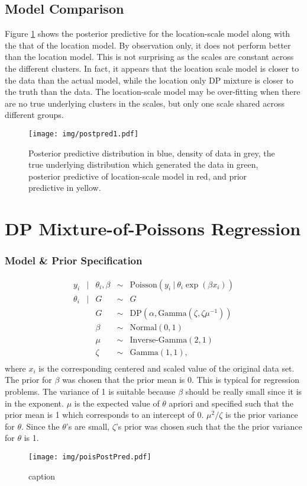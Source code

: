 \documentclass{article}
\def\beginmyfig{\begin{figure}[h]\center}
\def\endmyfig{\end{figure}}
\begin{document}
\subsection{Model Comparison}
Figure \ref{fig:postpred1} shows the posterior predictive for the
location-scale model along with the that of the location model. By observation
only, it does not perform better than the location model. This is not
surprising as the scales are constant across the different clusters. In fact,
it appears that the location scale model is closer to the data than the actual
model, while the location only DP mixture is closer to the truth than the data.
The location-scale model may be over-fitting when there are no true underlying
clusters in the scales, but only one scale shared across different groups.
\beginmyfig
  \texttt{[image: img/postpred1.pdf]}
  \caption{Posterior predictive distribution in blue, density of data in grey, the true
  underlying distribution which generated the data in green, posterior predictive of
  location-scale model in red, and prior predictive in yellow.}
  \label{fig:postpred1}
\endmyfig

\section{DP Mixture-of-Poissons Regression}
\subsubsection{Model \& Prior Specification}
\[
  \begin{array}{rclcl}
    y_i &|& \theta_i,\beta &\sim& \text{Poisson}(y_i~|~\theta_i\exp{(\beta x_i)}) \\
    \theta_i &|& G &\sim& G \\
             && G &\sim& \text{DP}(\alpha,\text{Gamma}(\zeta,\zeta\mu^{-1})) \\
             && \beta &\sim& \text{Normal}(0,1) \\
             && \mu &\sim& \text{Inverse-Gamma}(2,1) \\
             && \zeta &\sim& \text{Gamma}(1,1),\\
  \end{array}
\]
where $x_i$ is the corresponding centered and scaled value of the original data
set.  The prior for $\beta$ was chosen that the prior mean is 0. This is
typical for regression problems. The variance of 1 is suitable because $\beta$
should be really small since it is in the exponent. $\mu$ is the expected value
of $\theta$ apriori and specified such that the prior mean is 1 which corresponds
to an intercept of 0. $\mu^2/\zeta$ is the prior variance for $\theta$. Since
the $\theta$'s are small, $\zeta$'s prior was chosen such that the the prior
variance for $\theta$ is 1.

\beginmyfig
  \texttt{[image: img/poisPostPred.pdf]}
  \caption{caption}
  \label{fig:poisPostPred}
\endmyfig
\end{document}
